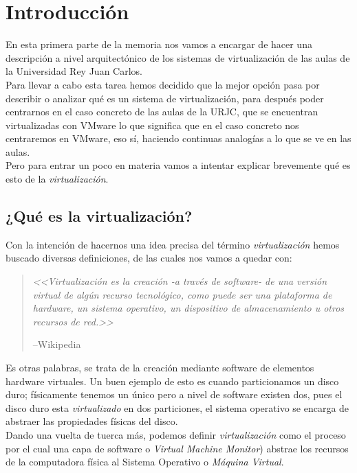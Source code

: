 \chapter{Introducción}
\lettrine[lines=1,slope=4pt,findent=0pt]{E}{}n esta primera parte de la memoria nos vamos a encargar de hacer una descripción a nivel arquitectónico de los sistemas de virtualización de las aulas de la Universidad Rey Juan Carlos.\\

Para llevar a cabo esta tarea hemos decidido que la mejor opción pasa por describir o analizar qué es un sistema de virtualización, para después poder centrarnos en el caso concreto de las aulas de la URJC, que se encuentran virtualizadas con VMware\cite{vmware} lo que significa que en el caso concreto nos centraremos en VMware, eso sí, haciendo continuas analogías a lo que se ve en las aulas.\\

Pero para entrar un poco en materia vamos a intentar explicar brevemente qué es esto de la \emph{virtualización}.

\section{¿Qué es la virtualización?}
Con la intención de hacernos una idea precisa del término \emph{virtualización} hemos buscado diversas definiciones, de las cuales nos vamos a quedar con:
\begin{quote}
\emph{<<Virtualización es la creación -a través de software- de una versión virtual de algún recurso tecnológico, como puede ser una plataforma de hardware, un sistema operativo, un dispositivo de almacenamiento u otros recursos de red.>>}
\begin{flushright}
--Wikipedia\cite{defvirwiki}
\end{flushright}
\end{quote}

Es otras palabras, se trata de la creación mediante software de elementos hardware virtuales. Un buen ejemplo de esto es cuando particionamos un disco duro; físicamente tenemos un único  pero a nivel de software existen dos, pues el disco duro esta \emph{virtualizado} en dos particiones, el sistema operativo se encarga de abstraer las propiedades físicas del disco.\\

Dando una vuelta de tuerca más, podemos definir \emph{virtualización} como el proceso por el cual una capa de software  o \emph{Virtual Machine Monitor}) abstrae los recursos de la computadora física al Sistema Operativo o \emph{Máquina Virtual}.\\

